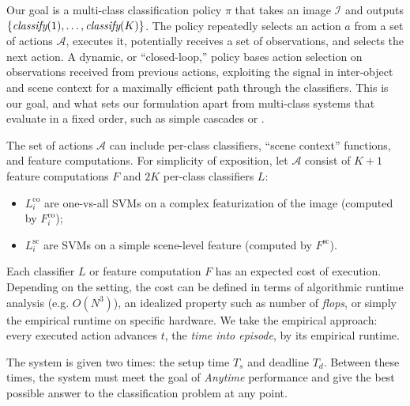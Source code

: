 \documentclass[runningheads]{llncs}
\begin{document}
Our goal is a multi-class classification policy $\pi$ that takes an image $\mathcal{I}$ and outputs $\{\emph{classify}(1), \dots, \emph{classify}(K)\}$.
The policy repeatedly selects an action $a$ from a set of actions $\mathcal{A}$, executes it, potentially receives a set of observations, and selects the next action.
A dynamic, or ``closed-loop,'' policy bases action selection on observations received from previous actions, exploiting the signal in inter-object and scene context for a maximally efficient path through the classifiers.
This is our goal, and what sets our formulation apart from multi-class systems that evaluate in a fixed order, such as simple cascades \cite{Viola2001} or .

The set of actions $\mathcal{A}$ can include per-class classifiers, ``scene context'' functions, and feature computations.
For simplicity of exposition, let $\mathcal{A}$ consist of $K+1$ feature computations $F$ and $2K$ per-class classifiers $L$:
\begin{itemize}
	\item $L^\text{co}_i$ are one-vs-all SVMs on a complex featurization of the image (computed by $F^\text{co}_i$);
	\item $L^\text{sc}_i$ are SVMs on a simple scene-level feature (computed by $F^\text{sc}$).
\end{itemize}


Each classifier $L$ or feature computation $F$ has an expected cost of execution.
Depending on the setting, the cost can be defined in terms of algorithmic runtime analysis (e.g. $O(N^3)$), an idealized property such as number of \emph{flops}, or simply the empirical runtime on specific hardware.
We take the empirical approach: every executed action advances $t$, the \emph{time into episode}, by its empirical runtime.

The system is given two times: the setup time $T_s$ and deadline $T_d$.
Between these times, the system must meet the goal of \emph{Anytime} performance and give the best possible answer to the classification problem at any point.
\end{document}
